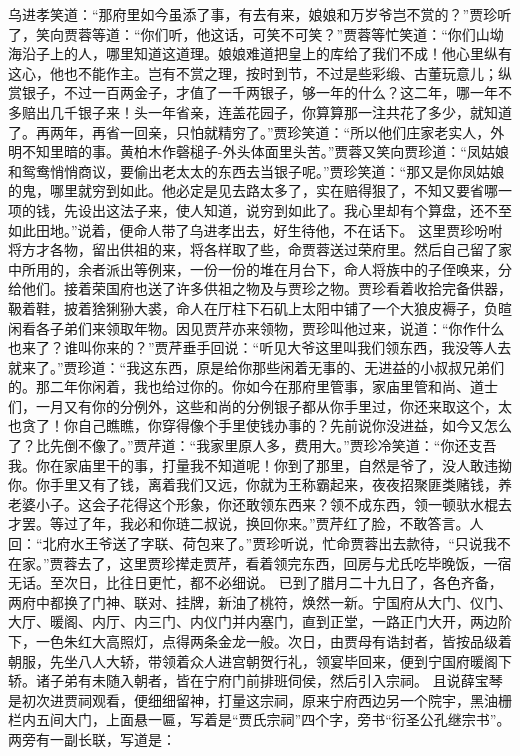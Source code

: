 \documentclass[12pt,oneside]{book}
\begin{document}
乌进孝笑道：“那府里如今虽添了事，有去有来，娘娘和万岁爷岂不赏的？”贾珍听了，笑向贾蓉等道：“你们听，他这话，可笑不可笑？”贾蓉等忙笑道：“你们山坳海沿子上的人，哪里知道这道理。娘娘难道把皇上的库给了我们不成！他心里纵有这心，他也不能作主。岂有不赏之理，按时到节，不过是些彩缎、古董玩意儿；纵赏银子，不过一百两金子，才值了一千两银子，够一年的什么？这二年，哪一年不多赔出几千银子来！头一年省亲，连盖花园子，你算算那一注共花了多少，就知道了。再两年，再省一回亲，只怕就精穷了。”贾珍笑道：“所以他们庄家老实人，外明不知里暗的事。黄柏木作磬槌子-外头体面里头苦。”贾蓉又笑向贾珍道：“凤姑娘和鸳鸯悄悄商议，要偷出老太太的东西去当银子呢。”贾珍笑道：“那又是你凤姑娘的鬼，哪里就穷到如此。他必定是见去路太多了，实在赔得狠了，不知又要省哪一项的钱，先设出这法子来，使人知道，说穷到如此了。我心里却有个算盘，还不至如此田地。”说着，便命人带了乌进孝出去，好生待他，不在话下。
这里贾珍吩咐将方才各物，留出供祖的来，将各样取了些，命贾蓉送过荣府里。然后自己留了家中所用的，余者派出等例来，一份一份的堆在月台下，命人将族中的子侄唤来，分给他们。接着荣国府也送了许多供祖之物及与贾珍之物。贾珍看着收拾完备供器，靸着鞋，披着猞猁狲大裘，命人在厅柱下石矶上太阳中铺了一个大狼皮褥子，负暄闲看各子弟们来领取年物。因见贾芹亦来领物，贾珍叫他过来，说道：“你作什么也来了？谁叫你来的？”贾芹垂手回说：“听见大爷这里叫我们领东西，我没等人去就来了。”贾珍道：“我这东西，原是给你那些闲着无事的、无进益的小叔叔兄弟们的。那二年你闲着，我也给过你的。你如今在那府里管事，家庙里管和尚、道士们，一月又有你的分例外，这些和尚的分例银子都从你手里过，你还来取这个，太也贪了！你自己瞧瞧，你穿得像个手里使钱办事的？先前说你没进益，如今又怎么了？比先倒不像了。”贾芹道：“我家里原人多，费用大。”贾珍冷笑道：“你还支吾我。你在家庙里干的事，打量我不知道呢！你到了那里，自然是爷了，没人敢违拗你。你手里又有了钱，离着我们又远，你就为王称霸起来，夜夜招聚匪类赌钱，养老婆小子。这会子花得这个形象，你还敢领东西来？领不成东西，领一顿驮水棍去才罢。等过了年，我必和你琏二叔说，换回你来。”贾芹红了脸，不敢答言。人回：“北府水王爷送了字联、荷包来了。”贾珍听说，忙命贾蓉出去款待，“只说我不在家。”贾蓉去了，这里贾珍撵走贾芹，看着领完东西，回房与尤氏吃毕晚饭，一宿无话。至次日，比往日更忙，都不必细说。
已到了腊月二十九日了，各色齐备，两府中都换了门神、联对、挂牌，新油了桃符，焕然一新。宁国府从大门、仪门、大厅、暖阁、内厅、内三门、内仪门并内塞门，直到正堂，一路正门大开，两边阶下，一色朱红大高照灯，点得两条金龙一般。次日，由贾母有诰封者，皆按品级着朝服，先坐八人大轿，带领着众人进宫朝贺行礼，领宴毕回来，便到宁国府暖阁下轿。诸子弟有未随入朝者，皆在宁府门前排班伺侯，然后引入宗祠。
且说薛宝琴是初次进贾祠观看，便细细留神，打量这宗祠，原来宁府西边另一个院宇，黑油栅栏内五间大门，上面悬一匾，写着是“贾氏宗祠”四个字，旁书“衍圣公孔继宗书”。两旁有一副长联，写道是：
\end{document}
